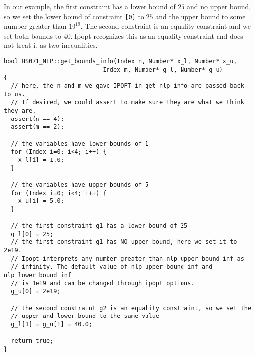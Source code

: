 \documentclass[letter,10pt]{article}
\begin{document}
{In our example, the first constraint has a lower bound of $25$ and no upper
bound, so we set the lower bound of constraint {\tt [0]} to $25$ and
the upper bound to some number greater than $10^{19}$. The second
constraint is an equality constraint and we set both bounds to
$40$. Ipopt recognizes this as an equality constraint and does not
treat it as two inequalities.

\begin{verbatim}
bool HS071_NLP::get_bounds_info(Index n, Number* x_l, Number* x_u,
                            Index m, Number* g_l, Number* g_u)
{
  // here, the n and m we gave IPOPT in get_nlp_info are passed back to us.
  // If desired, we could assert to make sure they are what we think they are.
  assert(n == 4);
  assert(m == 2);

  // the variables have lower bounds of 1
  for (Index i=0; i<4; i++) {
    x_l[i] = 1.0;
  }

  // the variables have upper bounds of 5
  for (Index i=0; i<4; i++) {
    x_u[i] = 5.0;
  }

  // the first constraint g1 has a lower bound of 25
  g_l[0] = 25;
  // the first constraint g1 has NO upper bound, here we set it to 2e19.
  // Ipopt interprets any number greater than nlp_upper_bound_inf as 
  // infinity. The default value of nlp_upper_bound_inf and nlp_lower_bound_inf
  // is 1e19 and can be changed through ipopt options.
  g_u[0] = 2e19;

  // the second constraint g2 is an equality constraint, so we set the 
  // upper and lower bound to the same value
  g_l[1] = g_u[1] = 40.0;

  return true;
}
\end{verbatim}

}
\end{document}
